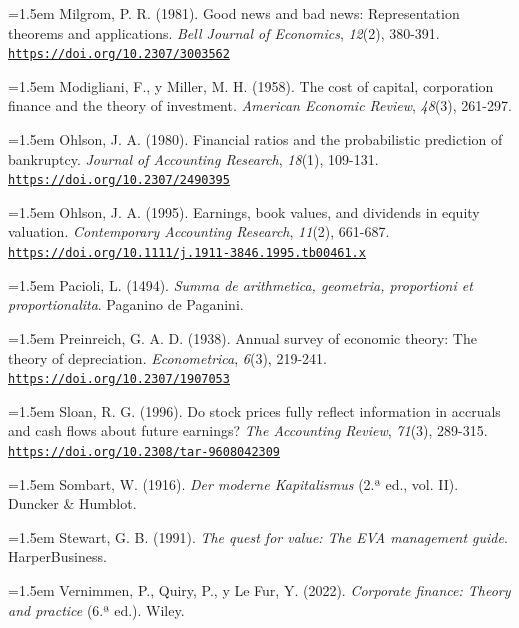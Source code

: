 \documentclass[10pt,a4paper]{article}
\begin{document}
\noindent\hangindent=1.5em Milgrom, P. R. (1981). Good news and bad news: Representation theorems and applications. \textit{Bell Journal of Economics}, \textit{12}(2), 380-391. \href{https://doi.org/10.2307/3003562}{\nolinkurl{https://doi.org/10.2307/3003562}}

\noindent\hangindent=1.5em Modigliani, F., y Miller, M. H. (1958). The cost of capital, corporation finance and the theory of investment. \textit{American Economic Review}, \textit{48}(3), 261-297.

\noindent\hangindent=1.5em Ohlson, J. A. (1980). Financial ratios and the probabilistic prediction of bankruptcy. \textit{Journal of Accounting Research}, \textit{18}(1), 109-131. \href{https://doi.org/10.2307/2490395}{\nolinkurl{https://doi.org/10.2307/2490395}}

\noindent\hangindent=1.5em Ohlson, J. A. (1995). Earnings, book values, and dividends in equity valuation. \textit{Contemporary Accounting Research}, \textit{11}(2), 661-687. \href{https://doi.org/10.1111/j.1911-3846.1995.tb00461.x}{\nolinkurl{https://doi.org/10.1111/j.1911-3846.1995.tb00461.x}}

\noindent\hangindent=1.5em Pacioli, L. (1494). \textit{Summa de arithmetica, geometria, proportioni et proportionalita}. Paganino de Paganini.

\noindent\hangindent=1.5em Preinreich, G. A. D. (1938). Annual survey of economic theory: The theory of depreciation. \textit{Econometrica}, \textit{6}(3), 219-241. \href{https://doi.org/10.2307/1907053}{\nolinkurl{https://doi.org/10.2307/1907053}}

\noindent\hangindent=1.5em Sloan, R. G. (1996). Do stock prices fully reflect information in accruals and cash flows about future earnings? \textit{The Accounting Review}, \textit{71}(3), 289-315. \href{https://doi.org/10.2308/tar-9608042309}{\nolinkurl{https://doi.org/10.2308/tar-9608042309}}

\noindent\hangindent=1.5em Sombart, W. (1916). \textit{Der moderne Kapitalismus} (2.ª ed., vol. II). Duncker \& Humblot.

\noindent\hangindent=1.5em Stewart, G. B. (1991). \textit{The quest for value: The EVA management guide}. HarperBusiness.

\noindent\hangindent=1.5em Vernimmen, P., Quiry, P., y Le Fur, Y. (2022). \textit{Corporate finance: Theory and practice} (6.ª ed.). Wiley.
\end{document}
